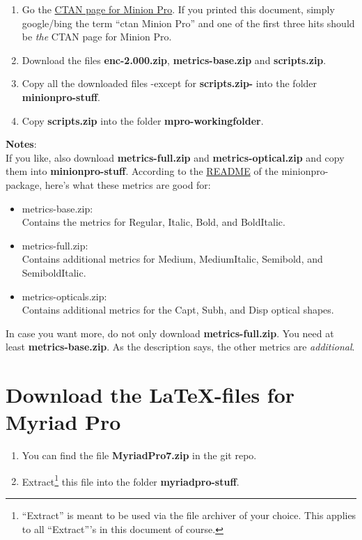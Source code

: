 \begin{enumerate}\setlength{\itemsep}{-2pt}
	\item Go the \href{http://tug.ctan.org/tex-archive/fonts/minionpro/}{CTAN page for Minion Pro}. If you printed this document, simply google/bing the term ``ctan Minion Pro'' and one of the first three hits should be \emph{the} CTAN page for Minion Pro.
	\item Download the files \textbf{enc-2.000.zip}, \textbf{metrics-base.zip} and \textbf{scripts.zip}.
	\item Copy all the downloaded files -except for \textbf{scripts.zip-} into the folder \textbf{minionpro-stuff}.
	\item Copy \textbf{scripts.zip} into the folder \textbf{mpro-workingfolder}.
\end{enumerate}
\textbf{Notes}:\\
If you like, also download \textbf{metrics-full.zip} and \textbf{metrics-optical.zip} and copy them into \textbf{minionpro-stuff}. According to the \href{http://www.ctan.org/tex-archive/fonts/Minion Pro/}{README} of the minionpro-package, here's what these metrics are good for:
\begin{itemize}\setlength{\itemsep}{-2pt}
	\item metrics-base.zip: \\
	Contains the metrics for Regular, Italic, Bold, and BoldItalic.
	\item metrics-full.zip: \\
	Contains additional metrics for Medium, MediumItalic, Semibold, and SemiboldItalic.
	\item metrics-opticals.zip: \\
	Contains additional metrics for the Capt, Subh, and Disp optical shapes.
\end{itemize}
In case you want more, do not only download \textbf{metrics-full.zip}. You need at least \textbf{metrics-base.zip}. As the description says, the other metrics are \textit{additional}.

\section{Download the LaTeX-files for Myriad Pro}\label{sec:download-myriad}

\begin{enumerate}\setlength{\itemsep}{-2pt}
	\item You can find the file \textbf{MyriadPro7.zip} in the git repo.
	\item Extract\footnote{``Extract'' is meant to be used via the file archiver of your choice. This applies to all ``Extract'''s in this document of course.} this file into the folder \textbf{myriadpro-stuff}.
\end{enumerate}

